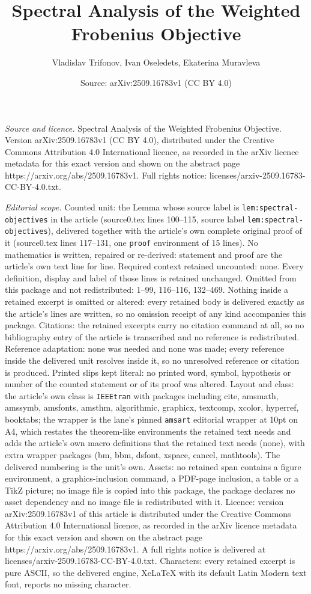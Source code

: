\documentclass[10pt,a4paper]{amsart}
\title[Spectral Analysis of the Weighted Frobenius Objective]{Spectral Analysis of the Weighted Frobenius Objective}
\author{Vladislav Trifonov, Ivan Oseledets, Ekaterina Muravleva}
\date{Source: arXiv:2509.16783v1 (CC BY 4.0)}
\begin{document}
\maketitle

\noindent\emph{Source and licence.} Spectral Analysis of the Weighted Frobenius Objective. Version arXiv:2509.16783v1 (CC BY 4.0), distributed under the Creative Commons Attribution 4.0 International licence, as recorded in the arXiv licence metadata for this exact version and shown on the abstract page https://arxiv.org/abs/2509.16783v1. Full rights notice: licenses/arxiv-2509.16783-CC-BY-4.0.txt.\par\smallskip

\noindent\textit{Editorial scope.} Counted unit: the Lemma whose source label is \texttt{lem:spectral-objectives} in the article (source0.tex lines 100--115, source label \texttt{lem:spectral-objectives}), delivered together with the article's own complete original proof of it (source0.tex lines 117--131, one \texttt{proof} environment of 15 lines). No mathematics is written, repaired or re-derived: statement and proof are the article's own text line for line. Required context retained uncounted: none. Every definition, display and label of those lines is retained unchanged. Omitted from this package and not redistributed: 1--99, 116--116, 132--469. Nothing inside a retained excerpt is omitted or altered: every retained body is delivered exactly as the article's lines are written, so no omission receipt of any kind accompanies this package. Citations: the retained excerpts carry no citation command at all, so no bibliography entry of the article is transcribed and no reference is redistributed. Reference adaptation: none was needed and none was made; every reference inside the delivered unit resolves inside it, so no unresolved reference or citation is produced. Printed slips kept literal: no printed word, symbol, hypothesis or number of the counted statement or of its proof was altered. Layout and class: the article's own class is \texttt{IEEEtran} with packages including cite, amsmath, amssymb, amsfonts, amsthm, algorithmic, graphicx, textcomp, xcolor, hyperref, booktabs; the wrapper is the lane's pinned \texttt{amsart} editorial wrapper at 10pt on A4, which restates the theorem-like environments the retained text needs and adds the article's own macro definitions that the retained text needs (none), with extra wrapper packages (bm, bbm, dsfont, xspace, cancel, mathtools). The delivered numbering is the unit's own. Assets: no retained span contains a figure environment, a graphics-inclusion command, a PDF-page inclusion, a table or a TikZ picture; no image file is copied into this package, the package declares no asset dependency and no image file is redistributed with it. Licence: version arXiv:2509.16783v1 of this article is distributed under the Creative Commons Attribution 4.0 International licence, as recorded in the arXiv licence metadata for this exact version and shown on the abstract page https://arxiv.org/abs/2509.16783v1. A full rights notice is delivered at licenses/arxiv-2509.16783-CC-BY-4.0.txt. Characters: every retained excerpt is pure ASCII, so the delivered engine, XeLaTeX with its default Latin Modern text font, reports no missing character.
\end{document}

